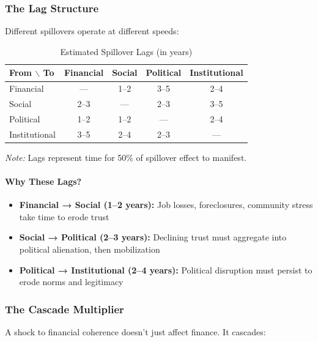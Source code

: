 \subsubsection{The Lag Structure}

Different spillovers operate at different speeds:

\begin{table}[htbp]
\centering
\caption{Estimated Spillover Lags (in years)}
\label{tab:lags}
\begin{tabular}{@{}lcccc@{}}
\toprule
\textbf{From $\backslash$ To} & \textbf{Financial} & \textbf{Social} & \textbf{Political} & \textbf{Institutional} \\
\midrule
Financial & --- & 1--2 & 3--5 & 2--4 \\
Social & 2--3 & --- & 2--3 & 3--5 \\
Political & 1--2 & 1--2 & --- & 2--4 \\
Institutional & 3--5 & 2--4 & 2--3 & --- \\
\bottomrule
\end{tabular}
\begin{flushleft}
\small\textit{Note:} Lags represent time for 50\% of spillover effect to manifest.
\end{flushleft}
\end{table}

\paragraph{Why These Lags?}

\begin{itemize}
    \item \textbf{Financial → Social (1--2 years):} Job losses, foreclosures, community stress take time to erode trust
    \item \textbf{Social → Political (2--3 years):} Declining trust must aggregate into political alienation, then mobilization
    \item \textbf{Political → Institutional (2--4 years):} Political disruption must persist to erode norms and legitimacy
\end{itemize}

\subsubsection{The Cascade Multiplier}

A shock to financial coherence doesn't just affect finance. It cascades:

